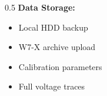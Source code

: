 \begin{frame}
\begin{columns}
\begin{column}{0.5\textwidth}
            \textbf{Data Storage:}
            \begin{itemize}
                \item Local HDD backup
                \item W7-X archive upload
                \item Calibration parameters
                \item Full voltage traces
            \end{itemize}
        \end{column}
    \end{columns}

\end{frame}

